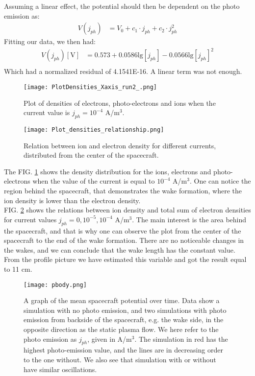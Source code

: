 \documentclass[aip, 
rsi, 
amsmath,
amssymb,
longbibliography,
reprint]{revtex4-1}
\begin{document}
Assuming a linear effect, the potential should then be dependent on the photo emission as:
\begin{align*}
V\left(j_{ph}\right) &= V_0 + c_1\cdot j_{ph} + c_2\cdot j_{ph}^2
\end{align*}
Fitting our data, we then had:
\begin{align*}
V\left(j_{ph}\right) \left[\text{V}\right]&= 0.573 + 0.0586 \text{lg}\left[j_{ph}\right] - 0.0566 \text{lg}\left[j_{ph}\right]^2\\
\end{align*}
Which had a normalized residual of 4.1541E-16. A linear term was not enough.\\

\begin{figure}
\texttt{[image: PlotDensities\_Xaxis\_run2\_.png]}
\caption{\label{fig:densityCurrent}Plot of densities of electrons, photo-electrons and ions when the current value is \(j_{ph} = 10^{-4}\) A/m$^3$.}
\end{figure}

\begin{figure}
\texttt{[image: Plot\_densities\_relationship.png]}
\caption{\label{fig:densityCurrentRelation}Relation between ion and electron density for different currents, distributed from the center of the spacecraft.}
\end{figure}

The FIG. \ref{fig:densityCurrent} shows the density distribution for the ions, electrons and photo-electrons when the value of the current is equal to $10^{-4}$ A/m$^3$. One can notice the region behind the spacecraft, that demonstrates the wake formation, where the ion density is lower than the electron density.\\

FIG. \ref{fig:densityCurrentRelation} shows the relations between ion density and total sum of electron densities for current values $j_{ph}=0, 10^{-5}, 10^{-4}$ A/m$^3$. The main interest is the area behind the spacecraft, and that is why one can observe the plot from the center of the spacecraft to the end of the wake formation. There are no noticeable changes in the wakes, and we can conclude that the wake length has the constant value. From the profile picture we have estimated this variable and got the result equal to 11 cm.

\begin{figure*}
\texttt{[image: pbody.png]}
\caption{A graph of the mean spacecraft potential over time. Data show a simulation with no photo emission, and two simulations with photo emission from backside of the spacecraft, e.g. the wake side, in the opposite direction as the static plasma flow. We here refer to the photo emission as $j_{ph}$, given in  A/m$^3$. The simulation in red has the highest photo-emission value, and the lines are in decreasing order to the one without. We also see that simulation with or without have similar oscillations. \label{fig:potential_time}}
\end{figure*}
\end{document}
